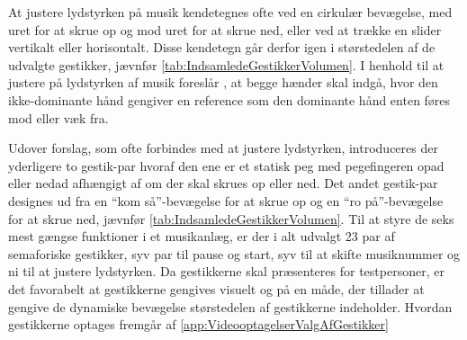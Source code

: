 \noindent
%
At justere lydstyrken på musik kendetegnes ofte ved en cirkulær bevægelse, med uret for at skrue op og mod uret for at skrue ned, eller ved at trække en slider vertikalt eller horisontalt. Disse kendetegn går derfor igen i størstedelen af de udvalgte gestikker, jævnfør \autoref{tab:IndsamledeGestikkerVolumen}. I henhold til at justere på lydstyrken af musik foreslår \textcite[s. 48]{PDF:UserDefinedGesturesTV}, at begge hænder skal indgå, hvor den ikke-dominante hånd gengiver en reference som den dominante hånd enten føres mod eller væk fra.

Udover forslag, som ofte forbindes med at justere lydstyrken, introduceres der yderligere to gestik-par hvoraf den ene er et statisk peg med pegefingeren opad eller nedad afhængigt af om der skal skrues op eller ned. Det andet gestik-par designes ud fra en \enquote{kom så}-bevægelse for at skrue op og en \enquote{ro på}-bevægelse for at skrue ned, jævnfør \autoref{tab:IndsamledeGestikkerVolumen}. \blankline
%
Til at styre de seks mest gængse funktioner i et musikanlæg, er der i alt udvalgt 23 par af semaforiske gestikker, syv par til pause og start, syv til at skifte musiknummer og ni til at justere lydstyrken. Da gestikkerne skal præsenteres for testpersoner, er det favorabelt at gestikkerne gengives visuelt og på en måde, der tillader at gengive de dynamiske bevægelse størstedelen af gestikkerne indeholder. Hvordan gestikkerne optages fremgår af \autoref{app:VideooptagelserValgAfGestikker}
%
